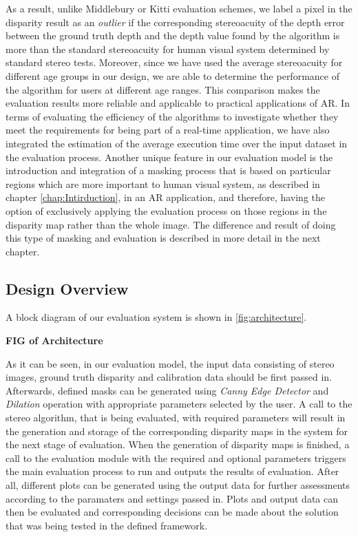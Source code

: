 As a result, unlike Middlebury or Kitti evaluation schemes, we label a pixel in the disparity result as an \textit{outlier} if the corresponding stereoacuity
of the depth error between the ground truth depth and the depth value found by the algorithm is more than the standard stereoacuity 
for human visual system determined
by standard stereo tests. 
Moreover, since we have used the average stereoacuity for different age groups \cite{garn06} in our design, we are able to determine the performance of the algorithm for users 
at different age ranges. This comparison
makes the evaluation results more reliable and applicable to practical applications of AR.
In terms of evaluating the efficiency of the algorithms to investigate whether they meet the requirements for being part of a real-time application, 
we have also integrated the estimation of the average execution time over the input dataset in the evaluation process.
Another unique feature in our evaluation model is the introduction and integration of a masking process that is based on particular regions
which are more important to human visual system, as described in chapter \ref{chap:Intirduction}, in an AR application, and 
therefore, having the option of exclusively applying the evaluation process on those regions in the disparity map rather than the whole image.
The difference and result of doing this type of masking and evaluation is described in more detail in the next chapter.

\subsection{Design Overview}
A block diagram of our evaluation system is shown in \ref{fig:architecture}.

\textbf{FIG of Architecture}

As it can be seen, in our evaluation model, the input data consisting of stereo images, ground truth disparity and calibration data should be first passed in. 
Afterwards, defined masks can be generated using \textit{Canny Edge Detector} and \textit{Dilation} operation with appropriate parameters 
selected by the user.
A call to the stereo algorithm, that is being evaluated, with required parameters will result in the generation and storage of the corresponding disparity maps
in the system for the next stage of evaluation. 
When the generation of disparity maps is finished, a call to the evaluation module with the required and optional parameters triggers the main evaluation
process to run and outputs the results of evaluation. After all, different plots can be generated 
using the output data for further assessments according to the paramaters and settings passed in. Plots and output data can then be evaluated and 
corresponding decisions can be made about the solution that was being tested in the defined framework.

